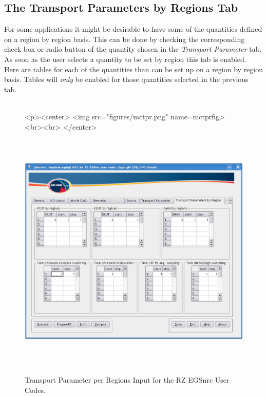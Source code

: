 \documentclass[12pt,twoside]{article}   %
\begin{document}
\newpage
\subsection{The Transport Parameters by Regions Tab}

For some applications it might be desirable to have some of the quantities defined on a region by
region basis. This can be done by checking the corresponding check box or radio button of the quantity
chosen in the {\em Transport Parameter} tab. As soon as the user selects a quantity to be set by region
this tab is enabled. Here are tables for each of the quantities than can be set up on a region by region
basis. Tables will {\em only} be enabled for those quantities selected in the previous tab. \\ \\

\begin{figure}[htb]
\begin{htmlonly}
\begin{rawhtml}
<p><center>
<img src="figures/mctpr.png" name=mctprfig><br><br>
</center>
\end{rawhtml}
\end{htmlonly}
\begin{latexonly}
\begin{center}
\includegraphics[height=11.56cm]{figures/mctpr}
\end{center}
\end{latexonly}
\begin{center}
\includegraphics[height=1mm]{figures/fake2}
\end{center}
\caption{Transport Parameter per Regions Input for the RZ EGSnrc User Codes.}
\label{mctprfig}
\end{figure}
\end{document}

